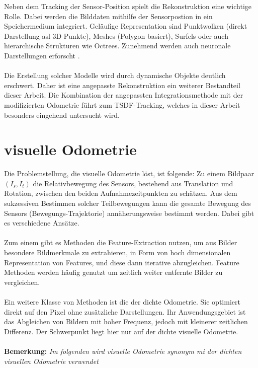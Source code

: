 \documentclass[12pt,DIV=15,BCOR=15mm,twoside,headsepline,abstract=true,listof=totoc,bibliography=totoc]{scrreprt}
\theoremstyle{remark}    %
\begin{document}
    Neben dem Tracking der Sensor-Position spielt die Rekonstruktion eine wichtige Rolle. Dabei werden die Bilddaten mithilfe der Sensorpostion in ein 
    Speichermedium integriert. Geläufige Representation sind Punktwolken (direkt Darstellung asl 3D-Punkte), 
    Meshes (Polygon basiert), Surfels oder auch hierarchische Strukturen wie Octrees. Zunehmend werden auch neuronale Darstellungen erforscht
    \cite{anurev}.\\\\
    Die Erstellung solcher Modelle wird durch dynamische Objekte deutlich erschwert. Daher ist eine angepasste Rekonstruktion ein weiterer Bestandteil dieser Arbeit.
    Die Kombination der angepassten Integrationsmethode mit der modifizierten Odometrie führt zum \ac{TSDF}-Tracking, welches in dieser Arbeit besonders 
    eingehend untersucht wird.

    \section{visuelle Odometrie}
    Die Problemstellung, die visuelle Odometrie löst, ist folgende: Zu einem Bildpaar $(I_s,I_t)$ die Relativbewegung des Sensors, bestehend aus Translation 
    und Rotation, zwischen den beiden Aufnahmezeitpunkten zu schätzen. 
    Aus dem sukzessiven Bestimmen solcher Teilbewegungen kann die gesamte Bewegung des Sensors (Bewegungs-Trajektorie) annäherungsweise bestimmt werden. 
    Dabei gibt es verschiedene Ansätze.\\\\
    Zum einem gibt es Methoden die Feature-Extraction nutzen, um aus Bilder besondere Bildmerkmale zu extrahieren, in Form von hoch dimensionalen 
    Representation von Features, und diese dann iterative abzugleichen. Feature Methoden werden häufig genutzt um zeitlich weiter
    entfernte Bilder zu vergleichen.\cite{opencv_matcher_tutorial,Mur_Artal_2015}\\\\
    Ein weitere Klasse von Methoden ist die der dichte Odometrie. Sie optimiert direkt auf den Pixel ohne zusätzliche Darstellungen. Ihr Anwendungsgebiet ist 
    das Abgleichen von Bildern mit hoher Frequenz, jedoch mit kleinerer zeitlichen Differenz. Der Schwerpunkt liegt hier nur auf der dichte visuelle Odometrie.\\\\ 
    \textbf{Bemerkung:} \emph{Im folgenden wird visuelle Odometrie synonym mi der dichten visuellen Odometrie verwendet}\\\\
\end{document}
